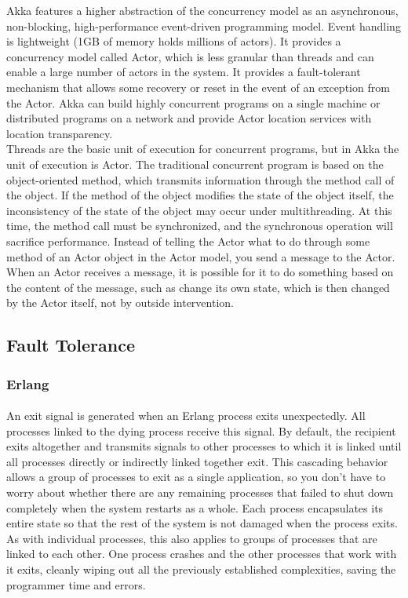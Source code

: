 \documentclass{article}
\begin{document}
Akka features a higher abstraction of the concurrency model as an asynchronous, non-blocking, high-performance event-driven programming model. Event handling is lightweight (1GB of memory holds millions of actors). It provides a concurrency model called Actor, which is less granular than threads and can enable a large number of actors in the system. It provides a fault-tolerant mechanism that allows some recovery or reset in the event of an exception from the Actor. Akka can build highly concurrent programs on a single machine or distributed programs on a network and provide Actor location services with location transparency.\\

Threads are the basic unit of execution for concurrent programs, but in Akka the unit of execution is Actor. The traditional concurrent program is based on the object-oriented method, which transmits information through the method call of the object. If the method of the object modifies the state of the object itself, the inconsistency of the state of the object may occur under multithreading. At this time, the method call must be synchronized, and the synchronous operation will sacrifice performance. Instead of telling the Actor what to do through some method of an Actor object in the Actor model, you send a message to the Actor.  When an Actor receives a message, it is possible for it to do something based on the content of the message, such as change its own state, which is then changed by the Actor itself, not by outside intervention.\\

\subsection{Fault Tolerance}\vspace{18pt}
\subsubsection{Erlang}\vspace{16pt}
\paragraph{}\vspace{11pt}\justifying
An exit signal is generated when an Erlang process exits unexpectedly. All processes linked to the dying process receive this signal. By default, the recipient exits altogether and transmits signals to other processes to which it is linked until all processes directly or indirectly linked together exit. This cascading behavior allows a group of processes to exit as a single application, so you don't have to worry about whether there are any remaining processes that failed to shut down completely when the system restarts as a whole. Each process encapsulates its entire state so that the rest of the system is not damaged when the process exits. As with individual processes, this also applies to groups of processes that are linked to each other. One process crashes and the other processes that work with it exits, cleanly wiping out all the previously established complexities, saving the programmer time and errors.\\
\end{document}
